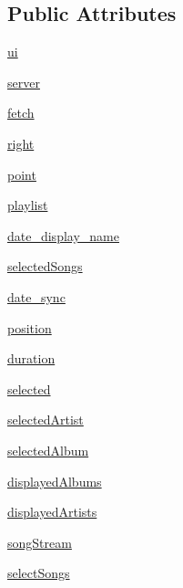 \subsection*{Public Attributes}
\begin{DoxyCompactItemize}
\item 
\hyperlink{classrunIG_1_1MyForm_a18d02c02cafdd6c26105affb94979f1a}{ui}
\item 
\hyperlink{classrunIG_1_1MyForm_a9335e70104e1701986ae468717990908}{server}
\item 
\hyperlink{classrunIG_1_1MyForm_a53c1e542e1b6843af201ab554ecc4454}{fetch}
\item 
\hyperlink{classrunIG_1_1MyForm_ae7745809cb09394e5170b7ef2f8a6711}{right}
\item 
\hyperlink{classrunIG_1_1MyForm_a6f3883fc42936cd04942f08ec0201276}{point}
\item 
\hyperlink{classrunIG_1_1MyForm_aef6ef5110ad6dd20ee5118f8650afe86}{playlist}
\item 
\hyperlink{classrunIG_1_1MyForm_aa6695ebdd501ade499a5a132360b7255}{date\_\-display\_\-name}
\item 
\hyperlink{classrunIG_1_1MyForm_a1c22c6c72377c4d5f7e437ec5f69b962}{selectedSongs}
\item 
\hyperlink{classrunIG_1_1MyForm_a4b104d365678f984240809af079d02a4}{date\_\-sync}
\item 
\hyperlink{classrunIG_1_1MyForm_a9b28e8afed640803760713715c350c69}{position}
\item 
\hyperlink{classrunIG_1_1MyForm_aeae605f19e57f49b1926e7ab31fee39e}{duration}
\item 
\hyperlink{classrunIG_1_1MyForm_a91de0b0262a24492bb2b91d192ac5376}{selected}
\item 
\hyperlink{classrunIG_1_1MyForm_ab018b816e8cb033f9ba0043971853fbd}{selectedArtist}
\item 
\hyperlink{classrunIG_1_1MyForm_a6cd207312c58ab1795505a398b5191d6}{selectedAlbum}
\item 
\hyperlink{classrunIG_1_1MyForm_a969956a36c70aaeefa62b5cb42500b33}{displayedAlbums}
\item 
\hyperlink{classrunIG_1_1MyForm_ad60f7273169725741a07f3ad660d51b7}{displayedArtists}
\item 
\hyperlink{classrunIG_1_1MyForm_a41d2dd757d7bd666e23be43241fb55a0}{songStream}
\item 
\hyperlink{classrunIG_1_1MyForm_aba6d221a71f637905ef1acfbaafee045}{selectSongs}
\end{DoxyCompactItemize}


